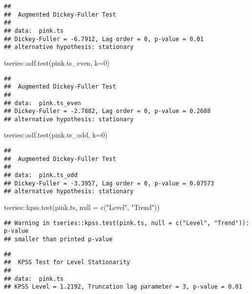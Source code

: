 \documentclass[
]{article}
\newenvironment{Shaded}{\begin{snugshade}}{\end{snugshade}}
\newcommand{\AttributeTok}[1]{\textcolor[rgb]{0.77,0.63,0.00}{#1}}
\newcommand{\DecValTok}[1]{\textcolor[rgb]{0.00,0.00,0.81}{#1}}
\newcommand{\FunctionTok}[1]{\textcolor[rgb]{0.00,0.00,0.00}{#1}}
\newcommand{\NormalTok}[1]{#1}
\newcommand{\SpecialCharTok}[1]{\textcolor[rgb]{0.00,0.00,0.00}{#1}}
\newcommand{\StringTok}[1]{\textcolor[rgb]{0.31,0.60,0.02}{#1}}
\begin{document}
\begin{verbatim}
## 
##  Augmented Dickey-Fuller Test
## 
## data:  pink.ts
## Dickey-Fuller = -6.7912, Lag order = 0, p-value = 0.01
## alternative hypothesis: stationary
\end{verbatim}

\begin{Shaded}
\begin{Highlighting}[]
\NormalTok{tseries}\SpecialCharTok{::}\FunctionTok{adf.test}\NormalTok{(pink.ts\_even, }\AttributeTok{k=}\DecValTok{0}\NormalTok{)}
\end{Highlighting}
\end{Shaded}

\begin{verbatim}
## 
##  Augmented Dickey-Fuller Test
## 
## data:  pink.ts_even
## Dickey-Fuller = -2.7882, Lag order = 0, p-value = 0.2688
## alternative hypothesis: stationary
\end{verbatim}

\begin{Shaded}
\begin{Highlighting}[]
\NormalTok{tseries}\SpecialCharTok{::}\FunctionTok{adf.test}\NormalTok{(pink.ts\_odd, }\AttributeTok{k=}\DecValTok{0}\NormalTok{)}
\end{Highlighting}
\end{Shaded}

\begin{verbatim}
## 
##  Augmented Dickey-Fuller Test
## 
## data:  pink.ts_odd
## Dickey-Fuller = -3.3957, Lag order = 0, p-value = 0.07573
## alternative hypothesis: stationary
\end{verbatim}

\begin{Shaded}
\begin{Highlighting}[]
\NormalTok{tseries}\SpecialCharTok{::}\FunctionTok{kpss.test}\NormalTok{(pink.ts, }\AttributeTok{null =} \FunctionTok{c}\NormalTok{(}\StringTok{"Level"}\NormalTok{, }\StringTok{"Trend"}\NormalTok{))}
\end{Highlighting}
\end{Shaded}

\begin{verbatim}
## Warning in tseries::kpss.test(pink.ts, null = c("Level", "Trend")): p-value
## smaller than printed p-value
\end{verbatim}

\begin{verbatim}
## 
##  KPSS Test for Level Stationarity
## 
## data:  pink.ts
## KPSS Level = 1.2192, Truncation lag parameter = 3, p-value = 0.01
\end{verbatim}
\end{document}

